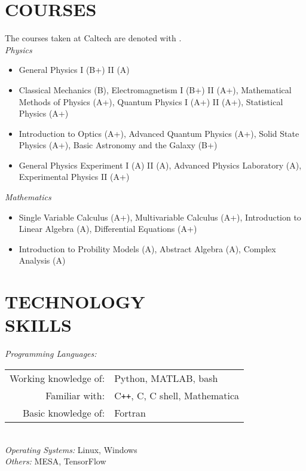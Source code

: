 \documentclass[margin, 10pt]{res} %
\begin{document}
\begin{resume}
\section{COURSES}
The courses taken at Caltech are denoted with \textsuperscript{\textdagger}.\\
\textit{Physics}
\begin{itemize}
    \item[] General Physics I (B+) II (A)
    \item[] Classical Mechanics (B), Electromagnetism I (B+) II (A+), Mathematical Methods of Physics (A+), Quantum Physics I (A+) II (A+), Statistical Physics\textsuperscript{\textdagger} (A+)
    \item[] Introduction to Optics (A+), Advanced Quantum Physics (A+), Solid State Physics (A+), Basic Astronomy and the Galaxy\textsuperscript{\textdagger} (B+)
    \item[] General Physics Experiment I (A) II (A), Advanced Physics Laboratory\textsuperscript{\textdagger} (A), Experimental Physics II (A+)
\end{itemize}
\textit{Mathematics}
\begin{itemize}
    \item[] Single Variable Calculus (A+), Multivariable Calculus (A+), Introduction to Linear Algebra (A), Differential Equations (A+)
    \item[] Introduction to Probility Models\textsuperscript{\textdagger} (A), Abstract Algebra (A), Complex Analysis (A)
\end{itemize}


\section{TECHNOLOGY \\ SKILLS} 

{\sl Programming Languages:}\\%
\begin{tabular}{rl}
    Working knowledge of:& Python, MATLAB, bash\\
    Familiar with:& C\texttt{++}, C, C shell, Mathematica\\
     Basic knowledge of:& Fortran\\
\end{tabular}\\
{\sl Operating Systems:} Linux, Windows \\
{\sl Others:} MESA, TensorFlow\\
 

\end{resume}
\end{document}
